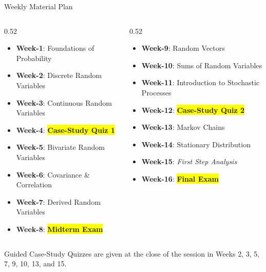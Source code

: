 \begin{frame}{Weekly Material Plan}
\small
    \begin{columns}
        \begin{column}{0.52\textwidth}
            \begin{itemize}\setlength\itemsep{1pt}
                \item \textbf{Week-1}: Foundations of Probability
                \item \textbf{Week-2}: Discrete Random Variables
                \item \textbf{Week-3}: Continuous Random Variables
                \item \textbf{Week-4}: \colorbox{yellow}{\textbf{Case-Study Quiz 1}}
                \item \textbf{Week-5}: Bivariate Random Variables
                \item \textbf{Week-6}: Covariance \& Correlation
                \item \textbf{Week-7}: Derived Random Variables
                \item \textbf{Week-8}: \colorbox{yellow}{\textbf{Midterm Exam}}
            \end{itemize}
        \end{column}
        \begin{column}{0.52\textwidth}
            \begin{itemize}\setlength\itemsep{1pt}
                \item \textbf{Week-9}: Random Vectors
                \item \textbf{Week-10}: Sums of Random Variables
                \item \textbf{Week-11}: Introduction to Stochastic Processes
                \item \textbf{Week-12}: \colorbox{yellow}{\textbf{Case-Study Quiz 2}}
                \item \textbf{Week-13}: Markov Chains
                \item \textbf{Week-14}: Stationary Distribution
                \item \textbf{Week-15}: \textit{First Step Analysis}
                \item \textbf{Week-16}: \colorbox{yellow}{\textbf{Final Exam}}
            \end{itemize}
        \end{column}
    \end{columns}
    \vspace{0.15cm}
    \footnotesize Guided Case-Study Quizzes are given at the close of the session in Weeks 2, 3, 5, 7, 9, 10, 13, and 15.
\end{frame}

